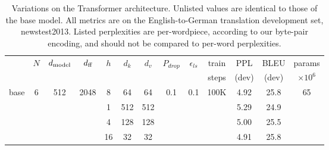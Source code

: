 \begin{table}[t]
  \caption{Variations on the Transformer architecture. Unlisted values are
    identical to those of the base model.  All metrics are on the English-to-German
    translation development set, newstest2013.  Listed perplexities are
    per-wordpiece, according to our byte-pair encoding, and should not be compared
    to per-word perplexities.}
  \label{tab:variations}
  \begin{center}
    \vspace{-2mm}
    \begin{tabular}{c|ccccccccc|ccc}
      \hline\rule{0pt}{2.0ex}
                                  & \multirow{2}{*}{$N$}             & \multirow{2}{*}{$d_{\text{model}}$}                                    &
      \multirow{2}{*}{$d_{\text{ff}}$}     & \multirow{2}{*}{$h$}             &
      \multirow{2}{*}{$d_k$}      & \multirow{2}{*}{$d_v$}           &
      \multirow{2}{*}{$P_{drop}$} & \multirow{2}{*}{$\epsilon_{ls}$} &
      train                       & PPL                              & BLEU                                                          & params                                                                                       \\
                                  &                                  &                                                               &        &      &     &     &     &     & steps & (dev)         & (dev)         & $\times10^6$ \\
      \hline\rule{0pt}{2.0ex}
      base                        & 6                                & 512                                                           & 2048   & 8    & 64  & 64  & 0.1 & 0.1 & 100K  & 4.92          & 25.8          & 65           \\
      \hline\rule{0pt}{2.0ex}
      \multirow{4}{*}{(A)}
                                  &                                  &                                                               &        & 1    & 512 & 512 &     &     &       & 5.29          & 24.9          &              \\
                                  &                                  &                                                               &        & 4    & 128 & 128 &     &     &       & 5.00          & 25.5          &              \\
                                  &                                  &                                                               &        & 16   & 32  & 32  &     &     &       & 4.91          & 25.8          &              \\

\end{tabular}
\end{center}
\end{table}

